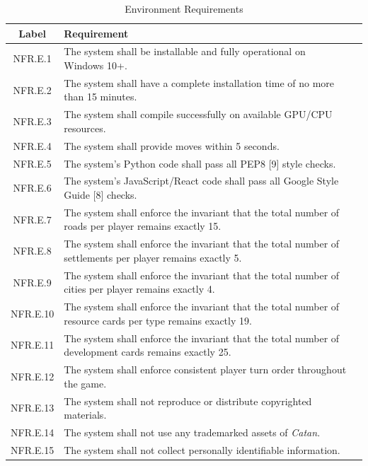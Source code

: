 \documentclass{article}
\begin{document}
\begin{table}[h!]
    \centering
    \caption{Environment Requirements }
    \label{tab:nfr}
    \begin{tabular}{|c|p{8.5cm}|>{\centering\arraybackslash}p{3.5cm}|}
    \hline
    \textbf{Label} & \textbf{Requirement} \\
    \hline
    NFR.E.1 & The system shall be installable and fully operational on Windows 10+. \label{NFR.E.1} \\
    \hline
    NFR.E.2 & The system shall have a complete installation time of no more than 15 minutes. \label{NFR.E.2} \\
    \hline
    NFR.E.3 & The system shall compile successfully on available GPU/CPU resources. \label{NFR.E.3} \\
    \hline
    NFR.E.4 & The system shall provide \AI{} moves within 5 seconds. \label{NFR.E.4} \\
    \hline
    NFR.E.5 & The system's Python code shall pass all PEP8 [9] style checks. \label{NFR.E.5} \\
    \hline
    NFR.E.6 & The system's JavaScript/React code shall pass all Google Style Guide [8] checks. \label{NFR.E.6} \\
    \hline
    NFR.E.7 & The system shall enforce the invariant that the total number of roads per player remains exactly 15. \label{NFR.E.7} \\
    \hline
    NFR.E.8 & The system shall enforce the invariant that the total number of settlements per player remains exactly 5. \label{NFR.E.8} \\
    \hline
    NFR.E.9 & The system shall enforce the invariant that the total number of cities per player remains exactly 4. \label{NFR.E.9} \\
    \hline
    NFR.E.10 & The system shall enforce the invariant that the total number of resource cards per type remains exactly 19. \label{NFR.E.10} \\
    \hline
    NFR.E.11 & The system shall enforce the invariant that the total number of development cards remains exactly 25. \label{NFR.E.11} \\
    \hline
    NFR.E.12 & The system shall enforce consistent player turn order throughout the game. \label{NFR.E.12} \\
    \hline
    NFR.E.13 & The system shall not reproduce or distribute copyrighted materials. \label{NFR.E.13} \\
    \hline
    NFR.E.14 & The system shall not use any trademarked assets of \emph{Catan{}}. \label{NFR.E.14} \\
    \hline
    NFR.E.15 & The system shall not collect personally identifiable information. \label{NFR.E.15} \\
    \hline
    \end{tabular}
\end{table}
\end{document}
